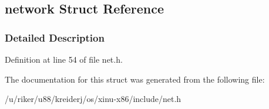 \hypertarget{structnetwork}{}\subsection{network Struct Reference}
\label{structnetwork}


\subsubsection{Detailed Description}


Definition at line 54 of file net.\+h.



The documentation for this struct was generated from the following file\+:\begin{DoxyCompactItemize}
\item 
/u/riker/u88/kreiderj/os/xinu-\/x86/include/net.\+h\end{DoxyCompactItemize}
